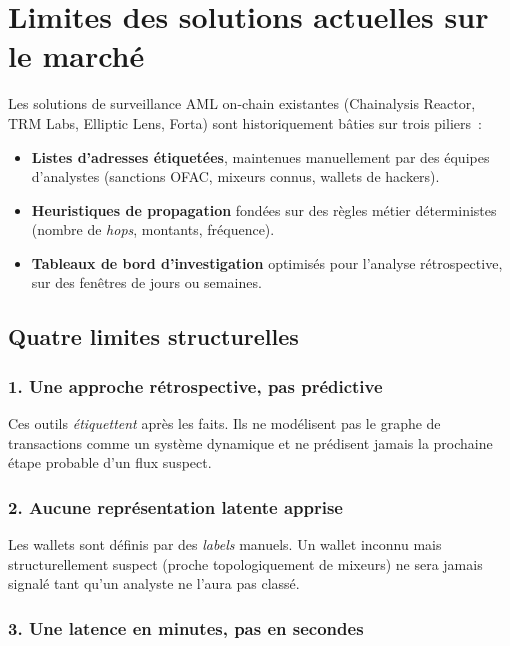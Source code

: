 \documentclass[11pt,a4paper]{article}
\begin{document}
\section{Limites des solutions actuelles sur le marché}

Les solutions de surveillance AML on-chain existantes
(Chainalysis Reactor, TRM Labs, Elliptic Lens, Forta) sont
historiquement bâties sur trois piliers~:

\begin{itemize}
  \item \textbf{Listes d'adresses étiquetées}, maintenues manuellement
        par des équipes d'analystes (sanctions OFAC, mixeurs connus,
        wallets de hackers).
  \item \textbf{Heuristiques de propagation} fondées sur des règles
        métier déterministes (nombre de \emph{hops}, montants,
        fréquence).
  \item \textbf{Tableaux de bord d'investigation} optimisés pour
        l'analyse rétrospective, sur des fenêtres de jours ou semaines.
\end{itemize}

\subsection{Quatre limites structurelles}

\subsubsection{1. Une approche rétrospective, pas prédictive}

Ces outils \emph{étiquettent} après les faits. Ils ne modélisent pas
le graphe de transactions comme un système dynamique et ne prédisent
jamais la prochaine étape probable d'un flux suspect.

\subsubsection{2. Aucune représentation latente apprise}

Les wallets sont définis par des \emph{labels} manuels. Un wallet
inconnu mais structurellement suspect (proche topologiquement de
mixeurs) ne sera jamais signalé tant qu'un analyste ne l'aura pas
classé.

\subsubsection{3. Une latence en minutes, pas en secondes}
\end{document}
